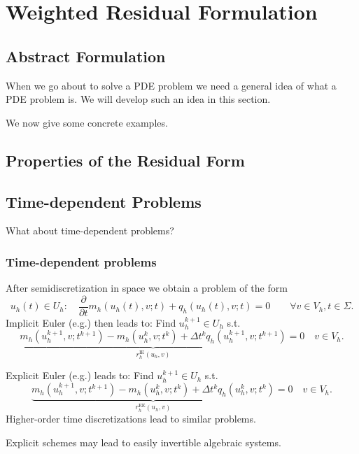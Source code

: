 \section{Weighted Residual Formulation}

\subsection{Abstract Formulation}

When we go about to solve a PDE problem we need a general idea of what
a PDE problem is. We will develop such an idea in this section.


We now give some concrete examples.


\subsection{Properties of the Residual Form}


\subsection{Time-dependent Problems}

What about time-dependent problems?

\begin{frame}
\frametitle<presentation>{Time-dependent problems}
After semidiscretization in space we obtain a problem of the form
\begin{equation*}
u_h(t)\in U_h : \quad \frac{\partial}{\partial t} m_h(u_h(t),v;t) + q_h(u_h(t),v;t)
= 0 \qquad \forall v\in V_h, t\in\Sigma. 
\end{equation*}
Implicit Euler (e.g.) then leads to: Find $u_h^{k+1}\in U_h$ s.t.
\begin{equation*}
\underbrace{m_h(u_h^{k+1},v;t^{k+1}) - m_h(u_h^{k},v;t^k) + \Delta
t^{k}q_h(u_h^{k+1},v;t^{k+1})}_{r_h^\text{IE}(u_h,v)}  = 0
\quad v\in V_h.
\end{equation*}

Explicit Euler (e.g.) leads to: Find  $u_h^{k+1}\in U_h$ s.t.
\begin{equation*}
\underbrace{m_h(u_h^{k+1},v;t^{k+1}) - m_h(u_h^{k},v;t^k) + \Delta
t^{k}q_h(u_h^{k},v;t^{k})}_{r_h^\text{EE}(u_h,v)}  = 0
\quad v\in V_h.
\end{equation*}
Higher-order time discretizations lead to similar problems.

Explicit schemes may lead to easily invertible algebraic systems.
\end{frame}

\cleardoublepage
